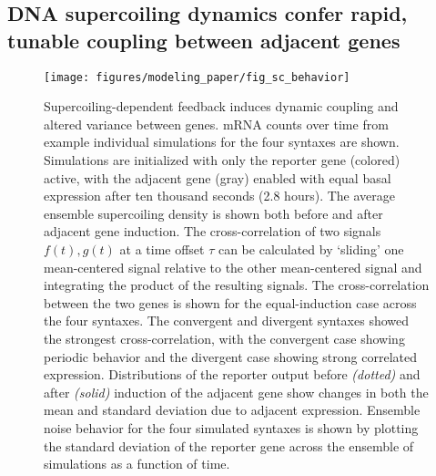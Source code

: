 \documentclass[11pt]{article}
\begin{document}
\subsection{DNA supercoiling dynamics confer rapid, tunable coupling between adjacent genes}

\begin{figure}[htbp]
    \centering
    {\texttt{[image: figures/modeling\_paper/fig\_sc\_behavior]}
    \label{fig:sc_examples}
    \label{fig:sc_density}
    \label{fig:cross_correlation_cartoon}
    \label{fig:orientation_cross_correlation}
    \label{fig:output_distribution_by_orientation_dynamics}
    \label{fig:noise_by_orientation}
    }
\end{figure}
\begin{figure}[htbp]
    \ContinuedFloat
    \caption{Supercoiling-dependent feedback induces dynamic coupling and altered variance between genes.
         mRNA counts over time from example individual simulations for the four syntaxes are shown. Simulations are initialized with only the reporter gene (colored) active, with the adjacent gene (gray) enabled with equal basal expression after ten thousand seconds (2.8 hours).
         The average ensemble supercoiling density is shown both before and after adjacent gene induction.
         The cross-correlation of two signals \(f(t), g(t)\) at a time offset \(\tau\) can be calculated by `sliding' one mean-centered signal relative to the other mean-centered signal and integrating the product of the resulting signals.
         The cross-correlation between the two genes is shown for the equal-induction case across the four syntaxes. The convergent and divergent syntaxes showed the strongest cross-correlation, with the convergent case showing periodic behavior and the divergent case showing strong correlated expression.
         Distributions of the reporter output before \textit{(dotted)} and after \textit{(solid)} induction of the adjacent gene show changes in both the mean and standard deviation due to adjacent expression.
         Ensemble noise behavior for the four simulated syntaxes is shown by plotting the standard deviation of the reporter gene across the ensemble of simulations as a function of time.
    }
    \label{fig:top:single_cell_behavior}
\end{figure}
\end{document}
